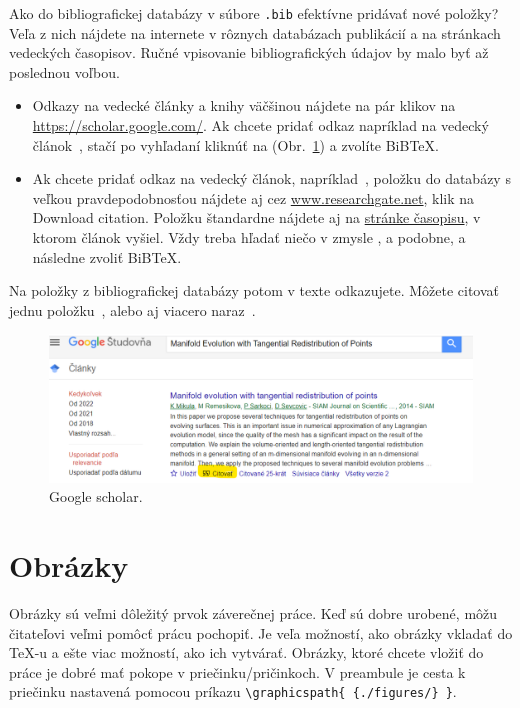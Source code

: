 Ako do bibliografickej databázy v súbore \verb|.bib| efektívne pridávať nové položky? Veľa z nich nájdete na internete v rôznych databázach publikácií a na stránkach vedeckých časopisov. Ručné vpisovanie bibliografických údajov by malo byť až poslednou voľbou.
\begin{itemize}
	\item Odkazy na vedecké články a knihy väčšinou nájdete na pár klikov na \url{https://scholar.google.com/}. Ak chcete pridať odkaz napríklad na vedecký článok~\cite{mikulaRemesikovaSarkoci2014}, stačí po vyhľadaní kliknúť na  (Obr.~\ref{fig:google_scholar}) a zvolíte BiBTeX.
	\item Ak chcete pridať odkaz na vedecký článok, napríklad~\cite{mikulaRemesikovaSarkoci2014}, položku do databázy s veľkou pravdepodobnosťou nájdete aj cez \href{https://www.researchgate.net/publication/275063142_Manifold_Evolution_with_Tangential_Redistribution_of_Points}{www.researchgate.net}, klik na Download citation. Položku štandardne nájdete aj na \href{https://epubs.siam.org/doi/10.1137/130927668}{stránke časopisu}, v ktorom článok vyšiel. Vždy treba hľadať niečo v zmysle ,  a podobne, a následne zvoliť BiBTeX.
\end{itemize}

Na položky z bibliografickej databázy potom v texte odkazujete. Môžete citovať jednu položku~\cite{eymard}, alebo aj viacero naraz~\cite{Handlovicova,mikulaRemesikovaSarkoci2014}.

\begin{figure}[h]
	\centering
	\includegraphics[width=1.0\linewidth]{google_scholar}
	\caption{Google scholar.}
	\label{fig:google_scholar}
\end{figure} 


\section{Obrázky}
Obrázky sú veľmi dôležitý prvok záverečnej práce. Keď sú dobre urobené, môžu čitateľovi veľmi pomôcť prácu pochopiť. Je veľa možností, ako obrázky vkladať do TeX-u a ešte viac možností, ako ich vytvárať. Obrázky, ktoré chcete vložiť do práce je dobré mať pokope v priečinku/pričinkoch. V preambule je cesta k priečinku nastavená pomocou príkazu \verb|\graphicspath{ {./figures/} }|.

